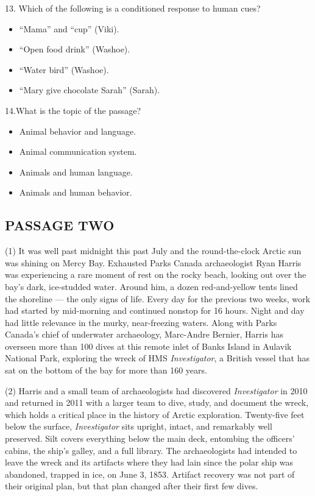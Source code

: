 \documentclass[UTF8,11pt]{ctexart}
\begin{document}
13. Which of the following is a conditioned response to human cues?


\begin{itemize}[leftmargin=2em,itemsep=.2em,topsep=.4em]\item[A.] “Mama” and “cup” (Viki).
\item[B.] “Open food drink” (Washoe).
\item[C.] “Water bird” (Washoe).
\item[D.] “Mary give chocolate Sarah” (Sarah).
\end{itemize}

14.What is the topic of the passage?


\begin{itemize}[leftmargin=2em,itemsep=.2em,topsep=.4em]\item[A.] Animal behavior and language.
\item[B.] Animal communication system.
\item[C.] Animals and human language.
\item[D.] Animals and human behavior.
\end{itemize}

\subsection*{\textbf{PASSAGE TWO}}


(1) It was well past midnight this past July and the round-the-clock Arctic sun was shining on Mercy Bay. Exhausted Parks Canada archaeologist Ryan Harris was experiencing a rare moment of rest on the rocky beach, looking out over the bay’s dark, ice-studded water. Around him, a dozen red-and-yellow tents lined the shoreline — the only signs of life. Every day for the previous two weeks, work had started by mid-morning and continued nonstop for 16 hours. Night and day had little relevance in the murky, near-freezing waters. Along with Parks Canada’s chief of underwater archaeology, Marc-Andre Bernier, Harris has overseen more than 100 dives at this remote inlet of Banks Island in Aulavik National Park, exploring the wreck of HMS \textit{Investigator}, a British vessel that has sat on the bottom of the bay for more than 160 years.


(2) Harris and a small team of archaeologists had discovered \textit{Investigator} in 2010 and returned in 2011 with a larger team to dive, study, and document the wreck, which holds a critical place in the history of Arctic exploration. Twenty-five feet below the surface, \textit{Investigator} sits upright, intact, and remarkably well preserved. Silt covers everything below the main deck, entombing the officers’ cabins, the ship’s galley, and a full library. The archaeologists had intended to leave the wreck and its artifacts where they had lain since the polar ship was abandoned, trapped in ice, on June 3, 1853. Artifact recovery was not part of their original plan, but that plan changed after their first few dives.
\end{document}
